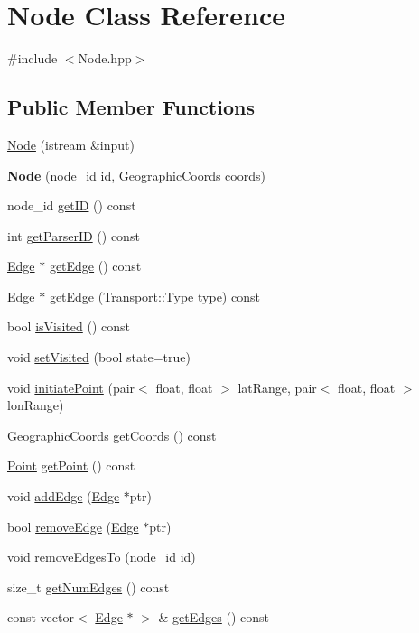 \hypertarget{class_node}{}\section{Node Class Reference}
\label{class_node}


{\ttfamily \#include $<$Node.\+hpp$>$}

\subsection*{Public Member Functions}
\begin{DoxyCompactItemize}
\item 
\hyperlink{class_node_a3662f8e557681586b8a44df334dbdfaa}{Node} (istream \&input)
\item 
\hypertarget{class_node_aceb6d58ed1ee8fe95c532453a1f09ad2}{}\label{class_node_aceb6d58ed1ee8fe95c532453a1f09ad2} 
{\bfseries Node} (node\+\_\+id id, \hyperlink{class_geographic_coords}{Geographic\+Coords} coords)
\item 
node\+\_\+id \hyperlink{class_node_a5e319f5c050c46590bed81fc4dc54325}{get\+ID} () const
\item 
int \hyperlink{class_node_ab79cb8588caac0a2d0dd99d7e7dd2f28}{get\+Parser\+ID} () const
\item 
\hyperlink{class_edge}{Edge} $\ast$ \hyperlink{class_node_a108b79d820efdc2768a148e9308b3c31}{get\+Edge} () const
\item 
\hyperlink{class_edge}{Edge} $\ast$ \hyperlink{class_node_aaf31a7f0f8e4dea82e48b1b09b89c217}{get\+Edge} (\hyperlink{class_transport_a1879cecfed0d4238e5a7af6d085db317}{Transport\+::\+Type} type) const
\item 
bool \hyperlink{class_node_a97dd8f95e09a0516f8939627f94bd58e}{is\+Visited} () const
\item 
void \hyperlink{class_node_a9d8e32dbc9c7a9e488b08f4fd1ce178f}{set\+Visited} (bool state=true)
\item 
void \hyperlink{class_node_a599f948564fa9f0cb358fe030161eb1e}{initiate\+Point} (pair$<$ float, float $>$ lat\+Range, pair$<$ float, float $>$ lon\+Range)
\item 
\hyperlink{class_geographic_coords}{Geographic\+Coords} \hyperlink{class_node_a77aeb1b8ddb7776e097f5ad8a56bd0d0}{get\+Coords} () const
\item 
\hyperlink{class_point}{Point} \hyperlink{class_node_a73562032360227efd9fe93d07ab2475f}{get\+Point} () const
\item 
void \hyperlink{class_node_a9c981148bc1602d4388c6ea6428450c4}{add\+Edge} (\hyperlink{class_edge}{Edge} $\ast$ptr)
\item 
bool \hyperlink{class_node_a4c78d9813537ccfc829401f979176428}{remove\+Edge} (\hyperlink{class_edge}{Edge} $\ast$ptr)
\item 
void \hyperlink{class_node_a70d6617e33b3fc219f9d3c1bd48d7cca}{remove\+Edges\+To} (node\+\_\+id id)
\item 
size\+\_\+t \hyperlink{class_node_abc4a69053f8f664c9b6a6a6bbe5d8c68}{get\+Num\+Edges} () const
\item 
const vector$<$ \hyperlink{class_edge}{Edge} $\ast$ $>$ \& \hyperlink{class_node_a10a4e5c428f496080172680cb20ea9e0}{get\+Edges} () const
\end{DoxyCompactItemize}
